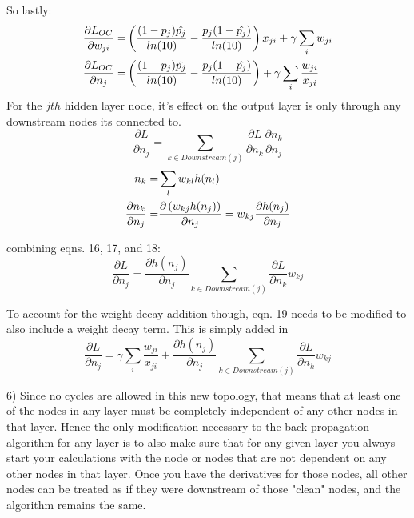 \documentclass[12pt]{article}
\begin{document}
So lastly: 
\begin{align}
    \frac{\partial L_{OC}}{\partial w_{ji}} =& \left(\frac{(1-p_j)\hat{p_j}}{ln(10)}
     -\frac{p_j(1-\hat{p_j})}{ln(10)} \right) x_{ji} + \gamma \sum_i w_{ji} \notag \\
    \frac{\partial L_{OC}}{\partial n_j} =& \left(\frac{(1-p_j)\hat{p_j}}{ln(10)}
     -\frac{p_j(1-\hat{p_j})}{ln(10)} \right) + \gamma \sum_i \frac{w_{ji}}{x_{ji}}
\end{align}
For the $jth$ hidden layer node, it's effect on the output layer is only through any downstream nodes its connected to. 
\begin{equation}
    \frac{\partial L}{\partial n_j} = \sum_{k \in Downstream(j)} \frac{\partial L}{\partial n_k}\frac{\partial n_k}{\partial n_j}
\end{equation}
\begin{align}
    n_k =& \sum_l w_{kl} h(n_l) \notag \\
    \frac{\partial n_k}{\partial n_j} =& \frac{\partial \left( w_{kj} h(n_j)\right)}{\partial n_j} = w_{kj}\frac{\partial h(n_j)}{\partial n_j}
\end{align}

combining eqns. 16, 17, and 18: 
\begin{equation}
    \frac{\partial L}{\partial n_j} = \frac{\partial h(n_j)}{\partial n_j}\sum_{k \in Downstream(j)} \frac{\partial L}{\partial n_k}w_{kj}
\end{equation}

To account for the weight decay addition though, eqn. 19 needs to be modified to also include a weight decay term. This is simply added in 
\begin{equation}
    \frac{\partial L}{\partial n_j} = \gamma \sum_i \frac{w_{ji}}{x_{ji}}+\frac{\partial h(n_j)}{\partial n_j}\sum_{k \in Downstream(j)} \frac{\partial L}{\partial n_k}w_{kj}
\end{equation} 

\pagebreak
\setcounter{equation}{0}
6) Since no cycles are allowed in this new topology, that means that at least one of the nodes in any layer must be
completely independent of any other nodes in that layer. Hence the only modification  necessary 
to the back propagation algorithm for any layer is to also make sure that for any given layer you always start your calculations
with the node or nodes that are not dependent on any other nodes in that layer. Once you have the derivatives for those nodes, 
all other nodes can be treated as if they were downstream of those "clean" nodes, and the algorithm remains the same. 
\end{document}
